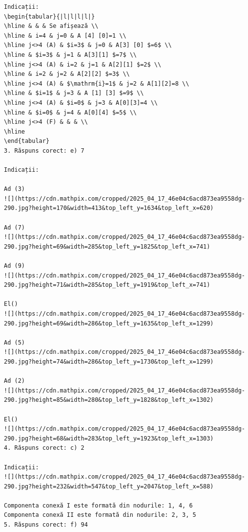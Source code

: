 \documentclass[10pt]{article}
\begin{document}
\begin{verbatim}
Indicații:
\begin{tabular}{|l|l|l|l|}
\hline & & & Se afișează \\
\hline & i=4 & j=0 & A [4] [0]=1 \\
\hline j<>4 (A) & $i=3$ & j=0 & A[3] [0] $=6$ \\
\hline & $i=3$ & j=1 & A[3][1] $=7$ \\
\hline j<>4 (A) & i=2 & j=1 & A[2][1] $=2$ \\
\hline & i=2 & j=2 & A[2][2] $=3$ \\
\hline j<>4 (A) & $\mathrm{i}=1$ & j=2 & A[1][2]=8 \\
\hline & $i=1$ & j=3 & A [1] [3] $=9$ \\
\hline j<>4 (A) & $i=0$ & j=3 & A[0][3]=4 \\
\hline & $i=0$ & j=4 & A[0][4] $=5$ \\
\hline j<>4 (F) & & & \\
\hline
\end{tabular}
3. Răspuns corect: e) 7

Indicații:

Ad (3)
![](https://cdn.mathpix.com/cropped/2025_04_17_46e04c6acd873ea9558dg-290.jpg?height=170&width=413&top_left_y=1634&top_left_x=620)

Ad (7)
![](https://cdn.mathpix.com/cropped/2025_04_17_46e04c6acd873ea9558dg-290.jpg?height=69&width=285&top_left_y=1825&top_left_x=741)

Ad (9)
![](https://cdn.mathpix.com/cropped/2025_04_17_46e04c6acd873ea9558dg-290.jpg?height=71&width=285&top_left_y=1919&top_left_x=741)

El()
![](https://cdn.mathpix.com/cropped/2025_04_17_46e04c6acd873ea9558dg-290.jpg?height=69&width=286&top_left_y=1635&top_left_x=1299)

Ad (5)
![](https://cdn.mathpix.com/cropped/2025_04_17_46e04c6acd873ea9558dg-290.jpg?height=74&width=286&top_left_y=1730&top_left_x=1299)

Ad (2)
![](https://cdn.mathpix.com/cropped/2025_04_17_46e04c6acd873ea9558dg-290.jpg?height=85&width=280&top_left_y=1828&top_left_x=1302)

El()
![](https://cdn.mathpix.com/cropped/2025_04_17_46e04c6acd873ea9558dg-290.jpg?height=68&width=283&top_left_y=1923&top_left_x=1303)
4. Răspuns corect: c) 2

Indicații:
![](https://cdn.mathpix.com/cropped/2025_04_17_46e04c6acd873ea9558dg-290.jpg?height=232&width=547&top_left_y=2047&top_left_x=588)

Componenta conexă I este formată din nodurile: 1, 4, 6
Componenta conexă II este formată din nodurile: 2, 3, 5
5. Răspuns corect: f) 94


\end{verbatim}
\end{document}
